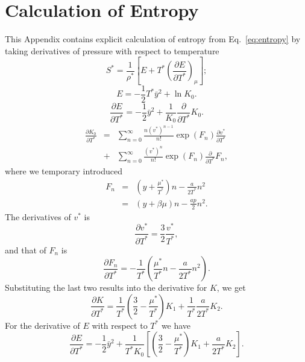 \documentclass[12pt]{article}
\numberwithin{equation}{section}
\begin{document}
	
	\section{\label{sec:app:entropy} Calculation of Entropy}
	This Appendix contains explicit calculation of entropy from Eq.~\eqref{eq:entropy} by taking derivatives of pressure with respect to temperature
	\begin{equation}
		S^{*} = \frac{1}{\rho^*} \left[E + T^* \left(\frac{\partial E}{\partial T^*}\right)_{\mu}\right];
	\end{equation}
	\begin{equation}
		E = -\frac{1}{2}T^* \bar{y}^2 + \ln K_0.
	\end{equation}
	\begin{equation}
		\frac{\partial E}{\partial T^*} = -\frac{1}{2}\bar{y}^2 + \frac{1}{K_0}\frac{\partial}{\partial T^*} K_0.
	\end{equation}
	\begin{eqnarray}
		\frac{\partial K_0}{\partial T^*} & = & \sum_{n=0}^{\infty} \frac{n (v^*)^{n-1}}{n!} \exp(F_n) \frac{\partial v^*}{\partial T^*} 
		\nonumber\\
		& + & \sum_{n=0}^{\infty} \frac{(v^*)^n}{n!} \exp(F_n) \frac{\partial}{\partial T^*} F_n,
	\end{eqnarray}
	where we temporary introduced
	\begin{eqnarray*}
		F_n & = & \left(y + \frac{\mu^*}{T^*} \right)n -\frac{a}{2T^*}n^2
		\\
		& = & \left(y + \beta\mu \right)n -\frac{ap}{2}n^2.
	\end{eqnarray*}
	The derivatives of $v^*$ is
	\begin{equation}
		\frac{\partial v^*}{\partial T^*} = \frac{3}{2} \frac{v^*}{T^*},
	\end{equation}
	and that of $F_n$ is
	\begin{equation}
		\frac{\partial F_n}{\partial T^*} = -\frac{1}{T^*} \left(\frac{\mu^*}{T^*}n - \frac{a}{2T^*}n^2\right).
	\end{equation}
	Substituting the last two results into the derivative for $K$, we get
	\begin{equation}
		\frac{\partial K}{\partial T^*} = \frac{1}{T^*} \left(\frac{3}{2} - \frac{\mu^*}{T^*} \right)K_1 + \frac{1}{T^*}\frac{a}{2 T^*} K_2.
	\end{equation}
	For the derivative of $E$ with respect to $T^*$ we have
	\begin{equation}
		\frac{\partial E}{\partial T^*} = -\frac{1}{2}\bar{y}^2 + \frac{1}{T^* K_0} \left[\left(\frac{3}{2} - \frac{\mu^*}{T^*} \right)K_1 + \frac{a}{2 T^*} K_2\right].
	\end{equation}
\end{document}
